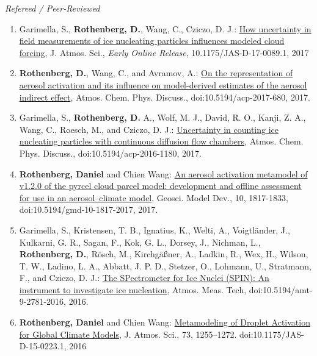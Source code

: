 \documentclass[11pt,letterpaper]{article}
\begin{document}
 \bigskip
 \emph{Refereed / Peer-Reviewed}
 \medskip
 \begin{enumerate}[itemindent=-10pt]


 \item Garimella, S., \textbf{Rothenberg, D.}, Wang, C., Cziczo, D. J.: \href{http://dx.doi.org/10.1175/JAS-D-17-0089.1}{How uncertainty in field measurements of ice nucleating particles influences modeled cloud forcing}, J. Atmos. Sci., \emph{Early Online Release}, 10.1175/JAS-D-17-0089.1, 2017

 \item \textbf{Rothenberg, D.}, Wang, C., and Avramov, A.: \href{http://doi.org/10.5194/acp-2017-680}{On the representation of aerosol activation and its influence on model-derived estimates of the aerosol indirect effect}, Atmos. Chem. Phys. Discuss., doi:10.5194/acp-2017-680, 2017.

 \item Garimella, S., \textbf{Rothenberg, D.} A., Wolf, M. J., David, R. O., Kanji, Z. A., Wang, C., Roesch, M., and Cziczo, D. J.: \href{http://dx.doi.org/10.5194/acp-2016-1180}{Uncertainty in counting ice nucleating particles with continuous diffusion flow chambers}, Atmos. Chem. Phys. Discuss., doi:10.5194/acp-2016-1180, 2017.

 \item \textbf{Rothenberg, Daniel} and Chien Wang:  \href{http://dx.doi.org/10.5194/gmd-10-1817-2017}{An aerosol activation metamodel of v1.2.0 of the pyrcel cloud parcel model: development and offline assessment for use in an aerosol–climate model}, Geosci. Model Dev., 10, 1817-1833, doi:10.5194/gmd-10-1817-2017, 2017.

 \item Garimella, S., Kristensen, T. B., Ignatius, K., Welti, A., Voigtländer, J., Kulkarni, G. R., Sagan, F., Kok, G. L., Dorsey, J., Nichman, L., \textbf{Rothenberg, D.}, Rösch, M., Kirchgäßner, A., Ladkin, R., Wex, H., Wilson, T. W., Ladino, L. A., Abbatt, J. P. D., Stetzer, O., Lohmann, U., Stratmann, F., and Cziczo, D. J.: \href{http://www.atmos-meas-tech.net/9/2781/2016/amt-9-2781-2016.html}{The SPectrometer for Ice Nuclei (SPIN): An instrument to investigate ice nucleation}, Atmos. Meas. Tech, doi:10.5194/amt-9-2781-2016, 2016.

 \item \textbf{Rothenberg, Daniel} and Chien Wang: \href{http://dx.doi.org/10.1175/JAS-D-15-0223.1}{Metamodeling of Droplet Activation for Global Climate Models}, J. Atmos. Sci., 73, 1255–1272. doi:10.1175/JAS-D-15-0223.1, 2016


\end{enumerate}
\end{document}
